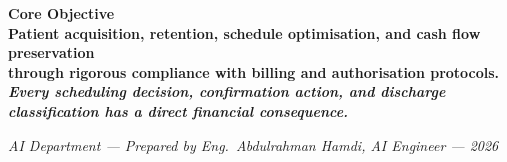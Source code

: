 \documentclass[11pt,a4paper]{article}
\begin{document}
\vspace{1.0em}
\begin{tcolorbox}[enhanced,colback=PrimaryBlue,colframe=AccentGold,
    boxrule=2pt,arc=6pt,left=12pt,right=12pt,top=10pt,bottom=10pt]
  \begin{center}
    \color{white}\large\bfseries Core Objective\\[0.5em]
    \color{SoftBlue}\normalsize
    Patient acquisition, retention, schedule optimisation, and cash flow preservation\\
    through rigorous compliance with billing and authorisation protocols.\\[0.5em]
    \color{AccentGold}\small\textit{Every scheduling decision, confirmation action,
    and discharge classification has a direct financial consequence.}
  \end{center}
\end{tcolorbox}

\vspace{0.6em}
\begin{center}
  \color{MidGray}\small
  \textit{AI Department --- Prepared by Eng.\ Abdulrahman Hamdi, AI Engineer --- 2026}
\end{center}
\end{document}
